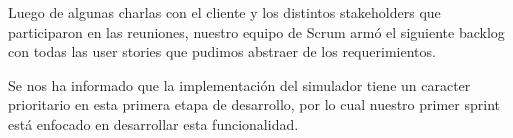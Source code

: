 Luego de algunas charlas con el cliente y los distintos stakeholders que participaron en las reuniones, 
nuestro equipo de Scrum armó el siguiente backlog con todas las user stories que pudimos abstraer de los requerimientos.

Se nos ha informado que la implementación del simulador tiene un caracter prioritario en esta primera etapa de desarrollo, por lo cual
nuestro primer sprint está enfocado en desarrollar esta funcionalidad.
